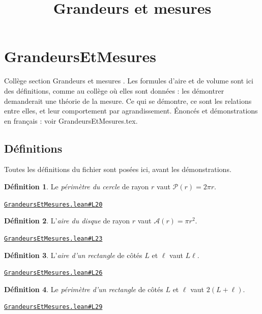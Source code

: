 \documentclass[11pt,a4paper]{article}
\title{Grandeurs et mesures}
\date{}
\theoremstyle{definition}
\newtheorem{definition}{Définition}
\theoremstyle{plain}
\newcommand{\source}[2]{\par\smallskip\noindent\hfill{\footnotesize\href{#1}{\texttt{#2}}}\par\smallskip}
\begin{document}
\maketitle
\sloppy

\section{GrandeursEtMesures}

\noindent
Collège \textemdash{} section \og{} Grandeurs et mesures \fg{}.
Les formules d'aire et de volume sont ici des définitions, comme au collège où elles sont
données : les démontrer demanderait une théorie de la mesure. Ce qui se démontre, ce sont
les relations entre elles, et leur comportement par agrandissement.
Énoncés et démonstrations en français : voir GrandeursEtMesures.tex.

\subsection{Définitions}

\noindent
Toutes les définitions du fichier sont posées ici, avant les démonstrations.

\begin{definition}
Le \emph{périmètre du cercle} de rayon $r$ vaut $\mathcal{P}(r) = 2\pi r$.
\end{definition}
\source{https://github.com/Commutator-IO/learn-lean/blob/main/cours/01-college/04-grandeurs-et-mesures/GrandeursEtMesures.lean\#L20}{GrandeursEtMesures.lean\#L20}

\begin{definition}
L'\emph{aire du disque} de rayon $r$ vaut $\mathcal{A}(r) = \pi r^2$.
\end{definition}
\source{https://github.com/Commutator-IO/learn-lean/blob/main/cours/01-college/04-grandeurs-et-mesures/GrandeursEtMesures.lean\#L23}{GrandeursEtMesures.lean\#L23}

\begin{definition}
L'\emph{aire d'un rectangle} de côtés $L$ et $\ell$ vaut $L\ell$.
\end{definition}
\source{https://github.com/Commutator-IO/learn-lean/blob/main/cours/01-college/04-grandeurs-et-mesures/GrandeursEtMesures.lean\#L26}{GrandeursEtMesures.lean\#L26}

\begin{definition}
Le \emph{périmètre d'un rectangle} de côtés $L$ et $\ell$ vaut $2(L + \ell)$.
\end{definition}
\source{https://github.com/Commutator-IO/learn-lean/blob/main/cours/01-college/04-grandeurs-et-mesures/GrandeursEtMesures.lean\#L29}{GrandeursEtMesures.lean\#L29}
\end{document}
